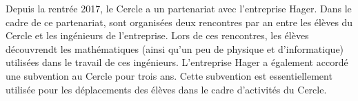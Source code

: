 \documentclass[11pt,notitlepage]{article}
\begin{document}
Depuis la rentr\'ee 2017, le Cercle a un partenariat avec l'entreprise Hager. Dans le cadre de ce partenariat, sont organis\'ees deux rencontres par an entre les \'el\`eves du Cercle et les ing\'enieurs de l'entreprise. Lors de ces rencontres, les \'el\`eves d\'ecouvrendt les math\'ematiques (ainsi qu'un peu de physique et d'informatique) utilis\'ees dans le travail de ces ing\'enieurs. L'entreprise Hager a \'egalement accord\'e une subvention au Cercle pour trois ans. Cette subvention est essentiellement utilis\'ee pour les d\'eplacements des \'el\`eves dans le cadre d'activit\'es du Cercle.


%	
%	
%	
%	
%	
%	
%	
%	
\end{document}
